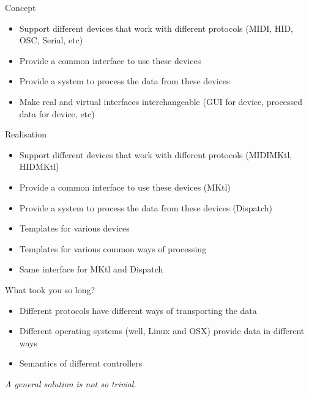 \documentclass[pdf,slideColor,colorBG,accumulate,total]{prosper}
\begin{document}
\begin{slide}{Concept}
 
 \vspace*{0.5cm}
 \begin{itemize}
  \item Support different devices that work with different protocols (MIDI, HID, OSC, Serial, etc)
  \item Provide a common interface to use these devices
  \item Provide a system to process the data from these devices
  \item Make real and virtual interfaces interchangeable (GUI for device, processed data for device, etc)
 \end{itemize}

\end{slide}

\begin{slide}{Realisation}
 
 \vspace*{0.5cm}
 \begin{itemize}
  \item Support different devices that work with different protocols (MIDIMKtl, HIDMKtl)
  \item Provide a common interface to use these devices (MKtl)
  \item Provide a system to process the data from these devices (Dispatch)
  \item Templates for various devices
  \item Templates for various common ways of processing
  \item Same interface for MKtl and Dispatch
 \end{itemize}

 
\end{slide}

\begin{slide}{What took you so long?}

\vspace*{1cm}

\begin{itemize}
 \item Different protocols have different ways of transporting the data
 \item Different operating systems (well, Linux and OSX) provide data in different ways
 \item Semantics of different controllers
\end{itemize}

\vspace*{1cm}

\begin{center}
\textit{ A general solution is not so trivial.}
\end{center}

 
\end{slide}
\end{document}

